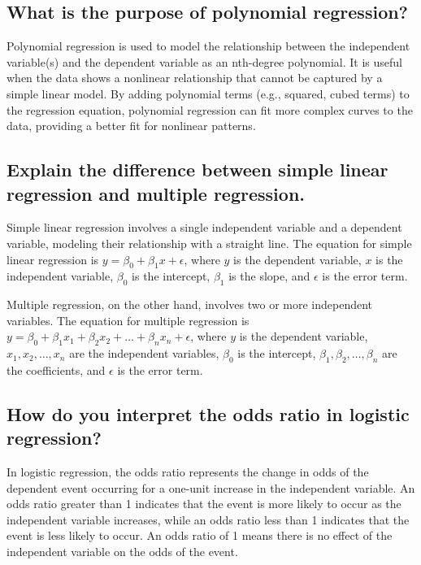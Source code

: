 \documentclass[12pt]{article}
\begin{document}
\subsection{What is the purpose of polynomial regression?}

Polynomial regression is used to model the relationship between the independent variable(s) and the dependent variable as an nth-degree polynomial. It is useful when the data shows a nonlinear relationship that cannot be captured by a simple linear model. By adding polynomial terms (e.g., squared, cubed terms) to the regression equation, polynomial regression can fit more complex curves to the data, providing a better fit for nonlinear patterns.

\subsection{Explain the difference between simple linear regression and multiple regression.}

Simple linear regression involves a single independent variable and a dependent variable, modeling their relationship with a straight line. The equation for simple linear regression is \( y = \beta_0 + \beta_1 x + \epsilon \), where \( y \) is the dependent variable, \( x \) is the independent variable, \( \beta_0 \) is the intercept, \( \beta_1 \) is the slope, and \( \epsilon \) is the error term.

Multiple regression, on the other hand, involves two or more independent variables. The equation for multiple regression is \( y = \beta_0 + \beta_1 x_1 + \beta_2 x_2 + \ldots + \beta_n x_n + \epsilon \), where \( y \) is the dependent variable, \( x_1, x_2, \ldots, x_n \) are the independent variables, \( \beta_0 \) is the intercept, \( \beta_1, \beta_2, \ldots, \beta_n \) are the coefficients, and \( \epsilon \) is the error term.

\subsection{How do you interpret the odds ratio in logistic regression?}

In logistic regression, the odds ratio represents the change in odds of the dependent event occurring for a one-unit increase in the independent variable. An odds ratio greater than 1 indicates that the event is more likely to occur as the independent variable increases, while an odds ratio less than 1 indicates that the event is less likely to occur. An odds ratio of 1 means there is no effect of the independent variable on the odds of the event.
\end{document}

